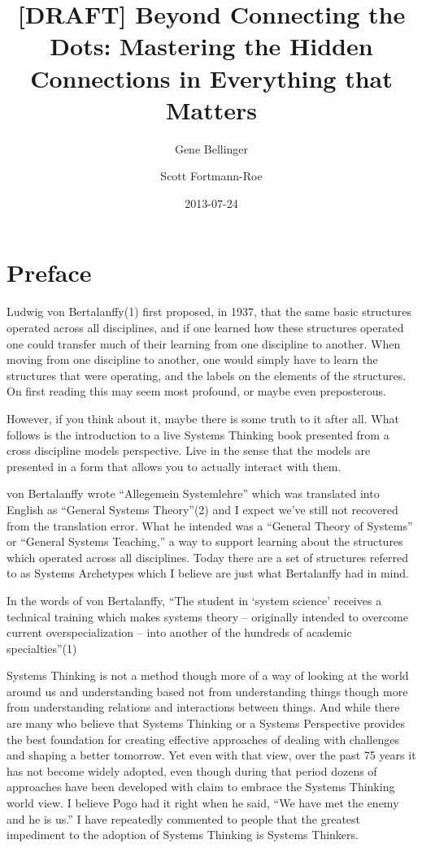 \documentclass[]{memoir}
\title{{[}DRAFT{]} Beyond Connecting the Dots: Mastering the Hidden Connections
       in Everything that Matters}
\author{Gene Bellinger \and Scott Fortmann-Roe}
\date{2013-07-24}
\begin{document}
\maketitle

{
\hypersetup{linkcolor=black}
\setcounter{tocdepth}{1}
\tableofcontents
}
\section{Preface}

Ludwig von Bertalanffy(1) first proposed, in 1937, that the same basic
structures operated across all disciplines, and if one learned how these
structures operated one could transfer much of their learning from one
discipline to another. When moving from one discipline to another, one
would simply have to learn the structures that were operating, and the
labels on the elements of the structures. On first reading this may seem
most profound, or maybe even preposterous.

However, if you think about it, maybe there is some truth to it after
all. What follows is the introduction to a live Systems Thinking book
presented from a cross discipline models perspective. Live in the sense
that the models are presented in a form that allows you to actually
interact with them.

von Bertalanffy wrote ``Allegemein Systemlehre'' which was translated
into English as ``General Systems Theory''(2) and I expect we've still
not recovered from the translation error. What he intended was a
``General Theory of Systems'' or ``General Systems Teaching,'' a way to
support learning about the structures which operated across all
disciplines. Today there are a set of structures referred to as Systems
Archetypes which I believe are just what Bertalanffy had in mind.

In the words of von Bertalanffy, ``The student in `system science'
receives a technical training which makes systems theory -- originally
intended to overcome current overspecialization -- into another of the
hundreds of academic specialties''(1)

Systems Thinking is not a method though more of a way of looking at the
world around us and understanding based not from understanding things
though more from understanding relations and interactions between
things. And while there are many who believe that Systems Thinking or a
Systems Perspective provides the best foundation for creating effective
approaches of dealing with challenges and shaping a better tomorrow. Yet
even with that view, over the past 75 years it has not become widely
adopted, even though during that period dozens of approaches have been
developed with claim to embrace the Systems Thinking world view. I
believe Pogo had it right when he said, ``We have met the enemy and he
is us.'' I have repeatedly commented to people that the greatest
impediment to the adoption of Systems Thinking is Systems Thinkers.
\end{document}
